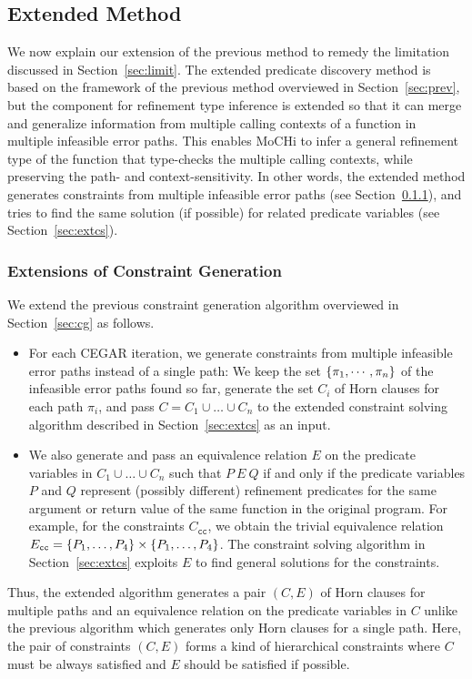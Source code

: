 \subsection{Extended Method}
\label{sec:ext}

We now explain our extension of the previous method to remedy the 
limitation discussed in Section~\ref{sec:limit}.  The extended predicate 
discovery method is based on the framework of the previous method 
overviewed in Section~\ref{sec:prev}, but the component for refinement 
type inference is extended so that it can merge and generalize 
information from multiple calling contexts of a function in multiple 
infeasible error paths.  This enables MoCHi to infer a general 
refinement type of the function that type-checks the multiple calling 
contexts, while preserving the path- and context-sensitivity.  In other 
words, the extended method generates constraints from multiple 
infeasible error paths (see Section~\ref{sec:extcg}), and tries to find 
the same solution (if possible) for related predicate variables (see 
Section~\ref{sec:extcs}).

\subsubsection{Extensions of Constraint Generation}
\label{sec:extcg}

We extend the previous constraint generation algorithm overviewed in 
Section~\ref{sec:cg} as follows.
\begin{itemize}
\item For each CEGAR iteration, we generate constraints from multiple 
infeasible error paths instead of a single path:  We keep the set 
\(\{{\pi_1,\cdots,\pi_n}\}\) of the infeasible error paths found so far, 
generate the set \(C_i\) of Horn clauses for each path \(\pi_i\), and 
pass \(C=C_1 \cup \dots \cup C_n\) to the extended constraint solving 
algorithm described in Section~\ref{sec:extcs} as an input.
\item We also generate and pass an equivalence relation \(E\) on the 
predicate variables in \(C_1 \cup \dots \cup C_n\) such that \(P\ E\ Q\) 
if and only if the predicate variables \(P\) and \(Q\) represent 
(possibly different) refinement predicates for the same argument or 
return value of the same function in the original program.  For example, 
for the constraints \(C_{\texttt{cc}}\), we obtain the trivial 
equivalence relation \(E_{\texttt{cc}}=\{{P_1,\dots,P_4}\} \times 
\{{P_1,\dots,P_4}\}\).  The constraint solving algorithm in 
Section~\ref{sec:extcs} exploits \(E\) to find general solutions for the 
constraints.
\end{itemize}
Thus, the extended algorithm generates a pair \((C,E)\) of Horn clauses 
for multiple paths and an equivalence relation on the predicate 
variables in \(C\) unlike the previous algorithm which generates only 
Horn clauses for a single path.  Here, the pair of constraints \((C,E)\) 
forms a kind of hierarchical constraints where \(C\) must be always 
satisfied and \(E\) should be satisfied if possible.

